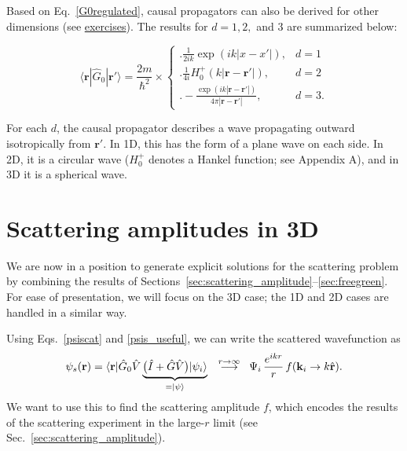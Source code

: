 \documentclass[prx,12pt]{revtex4-2}
\begin{document}
Based on Eq.~\eqref{G0regulated}, causal propagators can also be
derived for other dimensions (see
\hyperref[ex:1dpropagator]{exercises}).  The results for $d = 1, 2,$
and $3$ are summarized below:
\begin{framed}
  \begin{equation}
    \langle\mathbf{r}|\hat{G}_0|\mathbf{r}'\rangle = \frac{2m}{\hbar^2} \times \begin{cases} \Bigg.\displaystyle\frac{1}{2ik} \exp\left(ik|x-x'|\right),& d=1\\ \Bigg. \displaystyle\frac{1}{4i} H^+_0(k|\mathbf{r}-\mathbf{r'}|), & d=2 \\ \displaystyle \Bigg. - \frac{\exp\left(ik|\mathbf{r}-\mathbf{r}'|\right)}{4\pi|\mathbf{r}-\mathbf{r}'|}, & d = 3.  \end{cases}
    \label{propagator_solutions}
  \end{equation}
\end{framed}
\vskip -0.1in
\noindent
For each $d$, the causal propagator describes a wave propagating
outward isotropically from $\mathbf{r}'$.  In 1D, this has the form of
a plane wave on each side. In 2D, it is a circular wave ($H_0^+$
denotes a Hankel function; see Appendix A), and in 3D it is a
spherical wave.



\section{Scattering amplitudes in 3D}
\label{sec:3damp}

We are now in a position to generate explicit solutions for the
scattering problem by combining the results of
Sections~\ref{sec:scattering_amplitude}--\ref{sec:freegreen}.  For
ease of presentation, we will focus on the 3D case; the 1D and 2D
cases are handled in a similar way.

Using Eqs.~\eqref{psiscat} and \eqref{psis_useful}, we can write the
scattered wavefunction as
\begin{equation}
  \psi_s(\mathbf{r})
  = \langle\mathbf{r}|
  \hat{G}_0 \hat{V}
  \underbrace{\big(\hat{I} + \hat{G} \hat{V}\big) |\psi_i\rangle}_{= |\psi\rangle}
   \\
  \;\; \overset{r\rightarrow\infty}{\longrightarrow}\;\;
  \Psi_i \, \frac{e^{ikr}}{r} \, f(\mathbf{k}_i\rightarrow k\hat{\mathbf{r}}).
  \label{psis_expansion}
\end{equation}
We want to use this to find the scattering amplitude $f$, which
encodes the results of the scattering experiment in the large-$r$
limit (see Sec.~\ref{sec:scattering_amplitude}).
\end{document}
